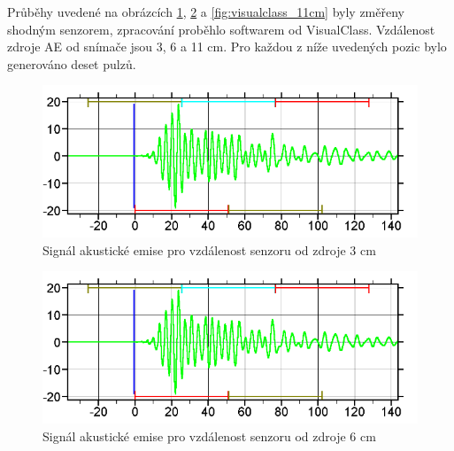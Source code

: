 Průběhy uvedené na obrázcích \ref{fig:visualclass_3cm}, \ref{fig:visualclass_6cm} a \ref{fig:visualclass_11cm} byly změřeny shodným senzorem, zpracování proběhlo softwarem od VisualClass. Vzdálenost zdroje AE od snímače jsou 3, 6 a 11 cm. Pro každou z níže uvedených pozic bylo generováno deset pulzů.
\begin{figure}[!h]
    \centering
    \includegraphics[width=0.7\linewidth]{obrazky/visualclass_3cm.png}
    \caption{Signál akustické emise pro vzdálenost senzoru od zdroje 3 cm \cite{vallen_visual_class}}
    \label{fig:visualclass_3cm}
\end{figure}

\begin{figure}[!h]
    \centering
    \includegraphics[width=0.7\linewidth]{obrazky/visualclass_3cm.png}
    \caption{Signál akustické emise pro vzdálenost senzoru od zdroje 6 cm \cite{vallen_visual_class}}
    \label{fig:visualclass_6cm}
\end{figure}

